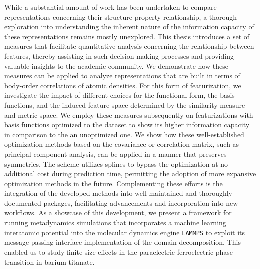 While a substantial amount of work has been undertaken to compare representations concerning their structure-property relationship, a thorough exploration into understanding the inherent nature of the information capacity of these representations remains mostly unexplored.
This thesis introduces a set of measures that facilitate quantitative analysis concerning the relationship between features, thereby assisting in such decision-making processes and providing valuable insights to the academic community.
We demonstrate how these measures can be applied to analyze representations that are built in terms of body-order correlations of atomic densities.
For this form of featurization, we investigate the impact of different choices for the functional form, the basis functions, and the induced feature space determined by the similarity measure and metric space.
We employ these measures subsequently on featurizations with basis functions optimized to the dataset to show its higher information capacity in comparison to the an unoptimized one. 
We show how these well-established optimization methods based on the covariance or correlation matrix, such as principal component analysis, can be applied in a manner that preserves symmetries.
The scheme utilizes splines to bypass the optimization at no additional cost during prediction time, permitting the adoption of more expansive optimization methods in the future.
Complementing these efforts is the integration of the developed methods into well-maintained and thoroughly documented packages, facilitating advancements and incorporation into new workflows. %
As a showcase of this development, we present a framework for running metadynamics simulations that incorporates a machine learning interatomic potential into the molecular dynamics engine \texttt{LAMMPS} to exploit its message-passing interface implementation of the domain decomposition.
This enabled us to study finite-size effects in the paraelectric-ferroelectric phase transition in barium titanate.


